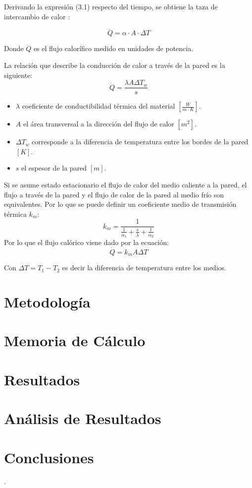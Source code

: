 \documentclass[letterpaper,11pt]{article} %
\begin{document}
 Derivando la expresión (3.1) respecto del tiempo, se obtiene la taza de intercambio de calor :
 
 \begin{equation}
     \dot Q = \alpha \cdot A \cdot \Delta T
 \end{equation}

 Donde $\dot Q$ es el flujo calorífico medido en unidades de potencia.
 
La relación que describe la conducción de calor a través de la pared es la siguiente:
\begin{equation}
    \Dot{Q} = \frac{\lambda A \Delta T_w}{s}
\end{equation}
\begin{itemize}
    \item $\lambda$ coeficiente de conductibilidad térmica del material $[\frac{W}{m\cdot K}]$.
    \item $A$ el área transversal a la dirección del flujo de calor $[m^2]$.
    \item $\Delta T_w$ corresponde a la diferencia de temperatura entre los bordes de la pared $[K]$.
    \item $s$ el espesor de la pared $[m]$.
\end{itemize}

Si se asume estado estacionario el flujo de calor del medio caliente a la pared, el flujo a través de la pared y el flujo de calor de la pared al medio frío son equivalentes.  Por lo que se puede definir un coeficiente medio de transmisión térmica $k_m$:
\begin{equation}
    k_m = \frac{1}{\frac{1}{\alpha_1}+\frac{s}{\lambda}+\frac{1}{\alpha_2}}
\end{equation}
Por lo que el flujo calórico viene dado por la ecuación:
\begin{equation}
    \Dot{Q} = k_m A \Delta T
\end{equation}

Con $\Delta T = T_1 - T_2$ es decir la diferencia de temperatura entre los medios.
\newpage

\section{Metodología}

\newpage
\section{Memoria de Cálculo}


\newpage
\section{Resultados}





\newpage
\section{Análisis de Resultados}



\newpage
\section{Conclusiones}.




\end{document}
